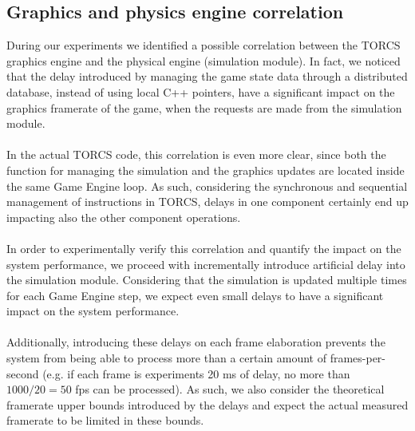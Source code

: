 \subsection{Graphics and physics engine correlation}
During our experiments we identified a possible correlation between the TORCS graphics engine and the physical engine (simulation module). In fact, we noticed that the delay introduced by managing the game state data through a distributed database, instead of using local C++ pointers, have a significant impact on the graphics framerate of the game, when the requests are made from the simulation module. \\ \\
In the actual TORCS code, this correlation is even more clear, since both the function for managing the simulation and the graphics updates are located inside the same Game Engine loop. As such, considering the synchronous and sequential management of instructions in TORCS, delays in one component certainly end up impacting also the other component operations. \\ \\
In order to experimentally verify this correlation and quantify the impact on the system performance, we proceed with incrementally introduce artificial delay into the simulation module. Considering that the simulation is updated multiple times for each Game Engine step, we expect even small delays to have a significant impact on the system performance. \\ \\
Additionally, introducing these delays on each frame elaboration prevents the system from being able to process more than a certain amount of frames-per-second (e.g. if each frame is experiments 20 ms of delay, no more than $1000/20=50$ fps can be processed). As such, we also consider the theoretical framerate upper bounds introduced by the delays and expect the actual measured framerate to be limited in these bounds.

